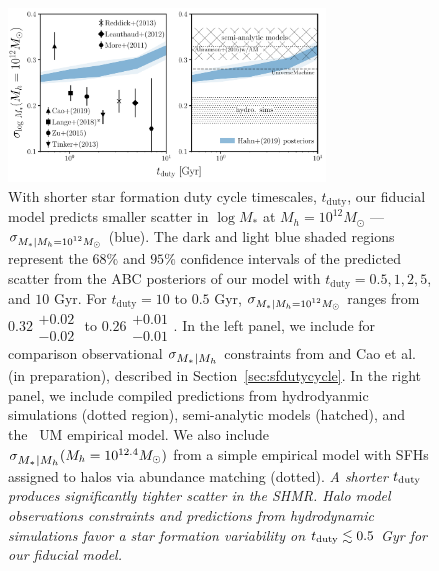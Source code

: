 \documentclass[12pt, letterpaper, preprint, tighten]{aastex62}
\newcommand{\edt}[1]{{\color{dred}{\bf} #1}}
\newcommand{\tduty}{t_{\rm duty}}
\newcommand{\siglogm}{\sigma_{\scaleto{M_*|M_h}{8pt}}}
\newcommand{\sigtwe}{\sigma_{\scaleto{M_*|M_h=10^{12}M_\odot}{8pt}}}
\begin{document}
\begin{figure}
\begin{center}
\includegraphics[width=0.75\textwidth]{figs/SHMRscatter_tduty_v2.pdf}
    \caption{With shorter star formation duty cycle timescales, $t_\mathrm{duty}$,
    our fiducial model predicts smaller scatter in $\log M_*$ at $M_h = 10^{12} M_\odot$ --- $\sigtwe$ (blue). 
    The dark and light blue shaded regions represent the $68\%$ and $95\%$ confidence
    intervals of the predicted scatter from the ABC posteriors of our
    model with $t_\mathrm{duty} = 0.5, 1, 2, 5$, and $10$ Gyr. For $t_\mathrm{duty} = 10$
    to $0.5$ Gyr, $\sigtwe$ ranges from $0.32\substack{+0.02\\ -0.02}$ to
    $0.26\substack{+0.01\\-0.01}$. In the left panel, we include for comparison
    observational $\siglogm$ constraints from \cite{yang2009, more2011, leauthaud2012, zu2015, tinker2017, lange2018a}
    and Cao et al. (in preparation), described in Section~\ref{sec:sfdutycycle}.
    In the right panel, we include compiled predictions from hydrodyanmic simulations
    (dotted region), semi-analytic models (hatched), and
    the~\cite{behroozi2019} {\sc UM} empirical model. We also include 
    $\siglogm(M_h = 10^{12.4} M_\odot)$ from a simple empirical model with \cite{abramson2016} 
    SFHs assigned to halos via abundance matching (dotted).
    \emph{A shorter $\tduty$ produces significantly tighter scatter in the SHMR.
    Halo model observations constraints and predictions from hydrodynamic simulations
    favor a star formation variability on $\tduty \lesssim 0.5$ Gyr for our fiducial
    model.}
    }
\label{fig:sigMstar_duty}
\end{center}
\end{figure}
\end{document}
